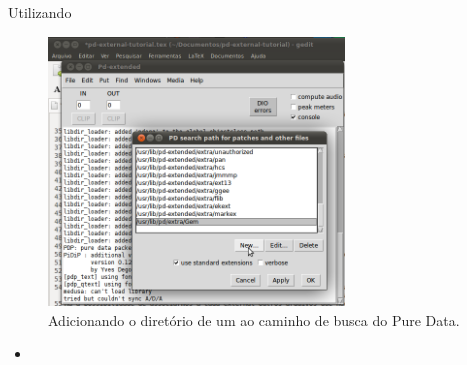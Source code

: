 \begin{frame}{Utilizando \externals}
\begin{figure}[h!]
  \centering
  \includegraphics[width=0.7\textwidth]{../images/path}
  \caption{Adicionando o diretório de um \external ao caminho de busca do Pure Data.}
  \label{fig:search-path}
\end{figure}
\begin{itemize}
\item
\end{itemize}
\end{frame}
